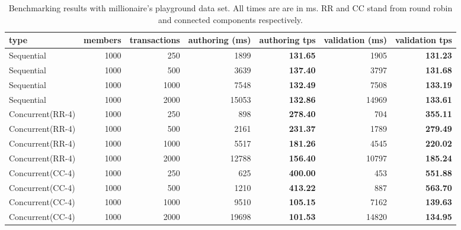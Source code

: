 \begin{table}[h]
\centering
\caption{Benchmarking results with millionaire's playground data set. All times are are in ms. RR and CC stand from round robin and connected components respectively.}
\label{table:bench1}
\resizebox{\textwidth}{!} {
	\begin{tabular}{l|rr|rr|rr}
	\textbf{type}    & \textbf{members} & \textbf{transactions} & \textbf{authoring (ms)} & authoring tps   & \textbf{validation (ms)} & validation tps  \\ \hline
	Sequential       & 1000             & 250                   & 1899                    & \textbf{131.65} & 1905                     & \textbf{131.23} \\
	Sequential       & 1000             & 500                   & 3639                    & \textbf{137.40} & 3797                     & \textbf{131.68} \\
	Sequential       & 1000             & 1000                  & 7548                    & \textbf{132.49} & 7508                     & \textbf{133.19} \\
	Sequential       & 1000             & 2000                  & 15053                   & \textbf{132.86} & 14969                    & \textbf{133.61} \\ \hline
	Concurrent(RR-4) & 1000             & 250                   & 898                     & \textbf{278.40} & 704                      & \textbf{355.11} \\
	Concurrent(RR-4) & 1000             & 500                   & 2161                    & \textbf{231.37} & 1789                     & \textbf{279.49} \\
	Concurrent(RR-4) & 1000             & 1000                  & 5517                    & \textbf{181.26} & 4545                     & \textbf{220.02} \\
	Concurrent(RR-4) & 1000             & 2000                  & 12788                   & \textbf{156.40} & 10797                    & \textbf{185.24} \\ \hline
	Concurrent(CC-4) & 1000             & 250                   & 625                     & \textbf{400.00} & 453                      & \textbf{551.88} \\
	Concurrent(CC-4) & 1000             & 500                   & 1210                    & \textbf{413.22} & 887                      & \textbf{563.70} \\
	Concurrent(CC-4) & 1000             & 1000                  & 9510                    & \textbf{105.15} & 7162                     & \textbf{139.63} \\
	Concurrent(CC-4) & 1000             & 2000                  & 19698                   & \textbf{101.53} & 14820                    & \textbf{134.95}
	\end{tabular}
}
\end{table}

